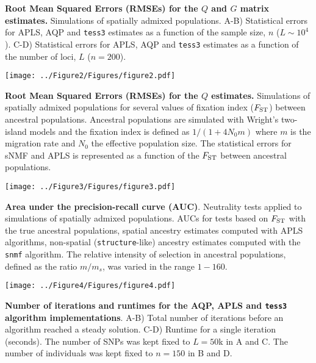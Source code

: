 \clearpage
\newpage


\begin{center}
\end{center}
 {\bf Root Mean Squared Errors (RMSEs) for the $Q$ and $G$ matrix estimates.} Simulations of spatially admixed populations. A-B) Statistical errors for APLS, AQP and {\tt tess3} estimates as a function of the sample size, $n$ ($L \sim 10^4$). C-D) Statistical errors for APLS, AQP and {\tt tess3} estimates as a function of the number of loci, $L$ ($n = 200$).

\clearpage
\newpage


\begin{center}
\texttt{[image: ../Figure2/Figures/figure2.pdf]}
\end{center}
 {\bf Root Mean Squared Errors (RMSEs) for the $Q$ estimates.} Simulations of spatially admixed populations for several values of fixation index ($F_{\rm ST}$) between ancestral populations. Ancestral populations are simulated with Wright’s two-island models and the fixation index is defined as $1 / (1 + 4 N_0 m)$ where $m$ is the migration rate and $N_0$ the effective population size. The statistical errors for sNMF and APLS is represented as a function of the $F_{\rm ST}$ between ancestral populations.

\clearpage
\newpage

\begin{center}
\texttt{[image: ../Figure3/Figures/figure3.pdf]}
\end{center}
 {\bf Area under the precision-recall curve (AUC)}. Neutrality tests applied to simulations of spatially admixed populations. AUCs for tests based on $F_{\rm ST}$ with the true ancestral populations,  spatial ancestry estimates computed with APLS algorithms, non-spatial ({\tt structure}-like) ancestry estimates computed with the {\tt snmf} algorithm. The relative intensity of selection in ancestral populations, defined as the ratio $m/m_s$, was varied in the range $1-160$.


\clearpage
\newpage

\begin{center}
\texttt{[image: ../Figure4/Figures/figure4.pdf]}
\end{center}
 {\bf Number of iterations and runtimes for the AQP, APLS and {\tt tess3} algorithm implementations}. A-B)   Total number of iterations before an algorithm reached a steady solution. C-D) Runtime for a single iteration (seconds). The number of SNPs was kept fixed to $L = 50$k in A and C. The number of individuals was kept fixed to $n = 150$ in B and D.



